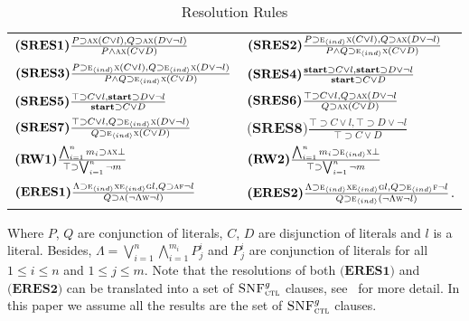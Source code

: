 \documentclass[letterpaper]{article}
\begin{document}
\begin{table*}[h]
    \centering
    \begin{tabular}{l l}
        $\textbf{(SRES1)}\frac{P\supset \textsc{a}\textsc{x}(C\vee l), Q\supset \textsc{a}\textsc{x}(D\vee \neg l)}{P\wedge \textsc{a}\textsc{x}(C\vee D)}$ & $\textbf{(SRES2)} \frac{P\supset \textsc{e}_{{\langle{ind}\rangle}} \textsc{x}(C\vee l), Q\supset \textsc{a}\textsc{x}(D\vee \neg l)}{P\wedge Q \supset \textsc{e}_{{\langle{ind}\rangle}}\textsc{x}(C\vee D)}$  \\
        $\textbf{(SRES3)} \frac{P\supset \textsc{e}_{{\langle{ind}\rangle}}\textsc{x}(C\vee l), Q \supset \textsc{e}_{{\langle{ind}\rangle}}\textsc{x}(D\vee \neg l)}{P\wedge Q\supset\textsc{e}_{{\langle{ind}\rangle}}\textsc{x}(C\vee D)}$ & $\textbf{(SRES4)} \frac{\textbf{start} \supset C\vee l, \textbf{start} \supset D \vee \neg l}{\textbf{start} \supset C\vee D}$ \\
        $\textbf{(SRES5)} \frac{\top \supset C\vee l, \textbf{start} \supset D \vee \neg l}{\textbf{start} \supset C \vee D}$  & $\textbf{(SRES6)} \frac{\top \supset C \vee l, Q \supset \textsc{a}\textsc{x}(D \vee \neg l}{Q\supset \textsc{a} \textsc{x}(C\vee D)}$ \\
        $\textbf{(SRES7)} \frac{\top \supset C \vee l, Q \supset \textsc{e}_{{\langle{ind}\rangle}} \textsc{x}(D \vee \neg l)}{Q\supset \textsc{e}_{{\langle{ind}\rangle}}\textsc{x}(C\vee D)}$ &  $\textbf{(SRES8)} \frac{\top \supset C\vee l, \top \supset D \vee \neg l}{\top \supset C \vee D}$\\
        $\textbf{(RW1)} \frac{\bigwedge_{i=1}^n m_i \supset \textsc{a}\textsc{x} \perp}{\top \supset \bigvee_{i=1}^n \neg m}$  & $\textbf{(RW2)} \frac{\bigwedge_{i=1}^n m_i \supset \textsc{e}_{{\langle{ind}\rangle}}\textsc{x} \perp}{\top \supset \bigvee_{i=1}^n \neg m}$ \\
        $\textbf{(ERES1)} \frac{\Lambda \supset \textsc{e}_{{\langle{ind}\rangle}} \textsc{x} \textsc{e}_{{\langle{ind}\rangle}}\textsc{g} l, Q \supset \textsc{a} \textsc{f} \neg l}{Q \supset \textsc{a}(\neg \Lambda \textsc{w} \neg l)}$  &  $\textbf{(ERES2)} \frac{\Lambda \supset \textsc{e}_{{\langle{ind}\rangle}} \textsc{x} \textsc{e}_{{\langle{ind}\rangle}}\textsc{g} l, Q \supset \textsc{e}_{{\langle{ind}\rangle}} \textsc{f} \neg l}{Q \supset \textsc{e}_{{\langle{ind}\rangle}}(\neg \Lambda \textsc{w} \neg l)}$.
    \end{tabular}
    \caption{Resolution Rules}
    Where $P$, $Q$ are conjunction of literals, $C$, $D$ are disjunction of literals and $l$ is a literal. Besides, $\Lambda=\bigvee_{i=1}^n \bigwedge_{i=1}^{m_i}P_j^i$ and $P_j^i$ are conjunction of literals for all $1\leq i\leq n$ and $1\leq j\leq m$. Note that the resolutions of both $\textbf{(ERES1)}$ and $\textbf{(ERES2)}$ can be translated into a set of ${\textsc{SNF}_{\textsc{ctl}}^g}$ clauses, see~\cite{zhang2009refined} for more detail. In this paper we assume all the results are the set of ${\textsc{SNF}_{\textsc{ctl}}^g}$ clauses.
    \label{tab:res}
\end{table*}
\end{document}
